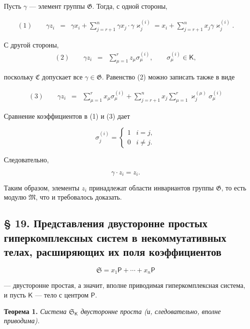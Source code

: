 \documentclass[11pt]{article}
\begin{document}
Пусть \(\gamma\) --- элемент группы \(\mathfrak G\). Тогда, с одной стороны,

\[
\begin{array}{rcl}
(1)\qquad \gamma z_i
&=&\gamma x_i+\displaystyle\sum_{j=r+1}^{n}\gamma x_j\cdot \gamma\varkappa_j^{(i)}
=x_i+\displaystyle\sum_{j=r+1}^{n}x_j\gamma\varkappa_j^{(i)}.
\end{array}
\]

С другой стороны,
\[
\begin{array}{rcl}
(2)\qquad \gamma z_i&=&\displaystyle\sum_{\mu=1}^{r}z_\mu\sigma_\mu^{(i)},
\qquad \sigma_\mu^{(i)}\in\mathsf K,
\end{array}
\]

поскольку \(\mathfrak C\) допускает все \(\gamma\in\mathfrak G\). Равенство (2) можно записать также в виде

\[
\begin{array}{rcl}
(3)\qquad \gamma z_i
&=&\displaystyle\sum_{\mu=1}^{r}x_\mu\sigma_\mu^{(i)}
+\displaystyle\sum_{j=r+1}^{n}x_j\sum_{\mu=1}^{r}\varkappa_j^{(\mu)}\sigma_\mu^{(i)}
\end{array}
\]

Сравнение коэффициентов в (1) и (3) дает

\[
\sigma_j^{(i)}=
\begin{cases}
1 & i=j,\\
0 & i\ne j.
\end{cases}
\]

Следовательно,

\[
\gamma\cdot z_i=z_i.
\]

Таким образом, элементы \(z_i\) принадлежат области инвариантов группы \(\mathfrak G\), то есть модулю \(\mathfrak M\), что и требовалось доказать.

\subsection*{§ 19. Представления двусторонне простых гиперкомплексных систем в некоммутативных телах, расширяющих их поля коэффициентов}\label{darstellungen-zweiseitig-einfacher-hyperkomplexer-systeme-in-nichtkommutativen-erweiterungskoerpern-ihrer-koeffizientenkoerper}

\[
\mathfrak S=x_1\mathsf P+\cdots+x_n\mathsf P
\]

--- двусторонне простая, а значит, вполне приводимая гиперкомплексная система, и пусть \(\mathsf K\) --- тело с центром \(\mathsf P\).

\textbf{Теорема 1.} \emph{Система \(\mathfrak S_{\mathsf K}\) двусторонне проста (и, следовательно, вполне приводима).}
\end{document}
